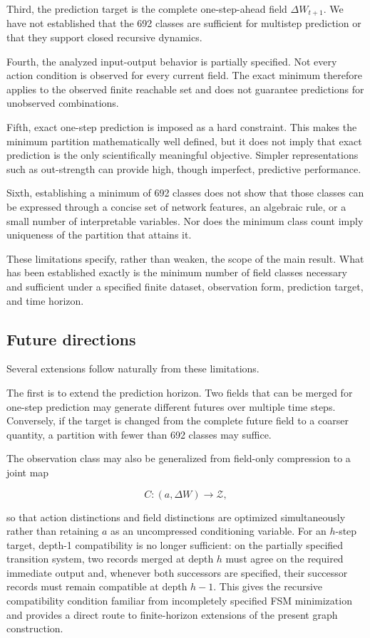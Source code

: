 \documentclass[
  11pt,
]{article}
\begin{document}
Third, the prediction target is the complete one-step-ahead field
\({\Delta W_{t+1}}\). We have not established that the 692 classes are
sufficient for multistep prediction or that they support closed
recursive dynamics.

Fourth, the analyzed input-output behavior is partially specified. Not
every action condition is observed for every current field. The exact
minimum therefore applies to the observed finite reachable set and does
not guarantee predictions for unobserved combinations.

Fifth, exact one-step prediction is imposed as a hard constraint. This
makes the minimum partition mathematically well defined, but it does not
imply that exact prediction is the only scientifically meaningful
objective. Simpler representations such as out-strength can provide
high, though imperfect, predictive performance.

Sixth, establishing a minimum of 692 classes does not show that those
classes can be expressed through a concise set of network features, an
algebraic rule, or a small number of interpretable variables. Nor does
the minimum class count imply uniqueness of the partition that attains
it.

These limitations specify, rather than weaken, the scope of the main
result. What has been established exactly is the minimum number of field
classes necessary and sufficient under a specified finite dataset,
observation form, prediction target, and time horizon.

\hypertarget{future-directions}{%
\subsection{Future directions}\label{future-directions}}

Several extensions follow naturally from these limitations.

The first is to extend the prediction horizon. Two fields that can be
merged for one-step prediction may generate different futures over
multiple time steps. Conversely, if the target is changed from the
complete future field to a coarser quantity, a partition with fewer than
692 classes may suffice.

The observation class may also be generalized from field-only
compression to a joint map

\[{C:(a,\Delta W)\longrightarrow\mathcal Z,}\]

so that action distinctions and field distinctions are optimized
simultaneously rather than retaining \({a}\) as an uncompressed
conditioning variable. For an \({h}\)-step target, depth-1 compatibility
is no longer sufficient: on the partially specified transition system,
two records merged at depth \({h}\) must agree on the required immediate
output and, whenever both successors are specified, their successor
records must remain compatible at depth \({h-1}\). This gives the
recursive compatibility condition familiar from incompletely specified
FSM minimization and provides a direct route to finite-horizon
extensions of the present graph construction.
\end{document}
